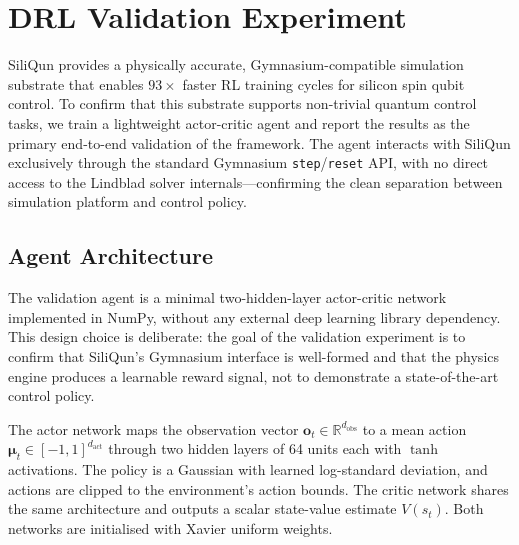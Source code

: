 
\section{DRL Validation Experiment}
\label{sec:drl_agent}

SiliQun provides a physically accurate, Gymnasium-compatible simulation substrate that enables $93\times$ faster RL training cycles for silicon spin qubit control. To confirm that this substrate supports non-trivial quantum control tasks, we train a lightweight actor-critic agent and report the results as the primary end-to-end validation of the framework. The agent interacts with SiliQun exclusively through the standard Gymnasium \texttt{step}/\texttt{reset} API, with no direct access to the Lindblad solver internals—confirming the clean separation between simulation platform and control policy.

\subsection{Agent Architecture}
\label{subsec:agent_arch}

The validation agent is a minimal two-hidden-layer actor-critic network
implemented in NumPy, without any external deep learning library dependency.
This design choice is deliberate: the goal of the validation experiment is to
confirm that SiliQun's Gymnasium interface is well-formed and that the physics
engine produces a learnable reward signal, not to demonstrate a state-of-the-art
control policy.

The actor network maps the observation vector $\mathbf{o}_t \in \mathbb{R}^{d_\text{obs}}$
to a mean action $\boldsymbol{\mu}_t \in [-1,1]^{d_\text{act}}$ through two hidden
layers of 64 units each with $\tanh$ activations.
The policy is a Gaussian with learned log-standard deviation, and actions are
clipped to the environment's action bounds.
The critic network shares the same architecture and outputs a scalar state-value
estimate $V(s_t)$.
Both networks are initialised with Xavier uniform weights.

